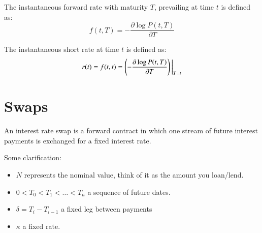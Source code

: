 \begin{definition}
The instantaneous forward rate with maturity $T$, prevailing at time $t$ is defined as:
\begin{equation*}
    f(t,T) = -\frac{\partial \log P(t,T)}{\partial T}
\end{equation*}
\end{definition}

\begin{definition}
The instantaneous short rate at time $t$ is defined as:
\begin{align*}
r(t) = f(t,t) = \left(-\frac{\partial \log P(t,T)}{\partial T}\right)\bigg{|}_{T = t}
\end{align*}
\end{definition}

\section{Swaps}
\label{sec: ZCB_swap}

\begin{definition}
An interest rate swap is a forward contract in which one stream of future interest payments is exchanged for a fixed interest rate. 
\end{definition}

Some clarification: 
\begin{itemize}
    \item $N$ represents the nominal value, think of it as the amount you loan/lend. 
    \item $0< T_{0} < T_{1} < \dots < T_{n}$ a sequence of future dates. 
    \item $\delta = T_{i} - T_{i-1}$ a fixed leg between payments 
    \item $\kappa$ a fixed rate.
\end{itemize} 

